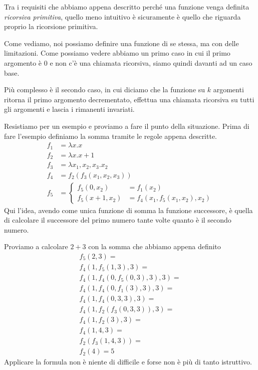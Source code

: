 Tra i requisiti che abbiamo appena descritto perché una
funzione venga definita \emph{ricorsiva primitiva}, quello
meno intuitivo è sicuramente è quello che riguarda proprio
la ricorsione primitiva.

Come vediamo, noi possiamo definire una funzione di se stessa,
ma con delle limitazioni. Come possiamo vedere abbiamo un
primo caso in cui il primo argomento è $0$ e non c'è una
chiamata ricorsiva, siamo quindi davanti ad un caso base.

Più complesso è il secondo caso, in cui diciamo che la funzione
su $k$ argomenti ritorna il primo argomento decrementato,
effettua una chiamata ricorsiva su tutti gli argomenti e lascia
i rimanenti invariati.

Resistiamo per un esempio e proviamo a fare il punto della
situazione. Prima di fare l'esempio definiamo la somma tramite
le regole appena descritte.
\[
	\begin{array}{ll}
		f_1 & = \lambda x.x                    \\
		f_2 & = \lambda x.x + 1                \\
		f_3 & = \lambda x_1, x_2, x_3 . x_2    \\
		f_4 & = f_2 (f_3 (x_1, x_2, x_3))      \\
		f_5 & = \begin{cases}
			        f_5 (0, x_2)     & = f_1 (x_2) \\
			        f_5 (x + 1, x_2) & =
			        f_4 (x_1, f_5(x_1, x_2), x_2)
		        \end{cases}
	\end{array}
\]
Qui l'idea, avendo come unica funzione di somma la funzione
successore, è quella di calcolare il successore del primo
numero tante volte quanto è il secondo numero.

\begin{example}
	Proviamo a calcolare $2 + 3$ con la somma che abbiamo
	appena definito
	\[
		\begin{array}{l}
			f_5(2, 3) =                         \\
			f_4 (1, f_5(1, 3), 3) =             \\
			f_4 (1, f_4(0, f_5 (0, 3), 3), 3) = \\
			f_4 (1, f_4(0, f_1 (3), 3), 3) =    \\
			f_4 (1, f_4(0, 3, 3), 3) =          \\
			f_4 (1, f_2(f_3(0, 3, 3)), 3) =     \\
			f_4 (1, f_2(3), 3) =                \\
			f_4 (1, 4, 3) =                     \\
			f_2 (f_3 (1, 4, 3)) =               \\
			f_2 (4) = 5
		\end{array}
	\]
	Applicare la formula non è niente di difficile e forse
	non è più di tanto istruttivo.
\end{example}

